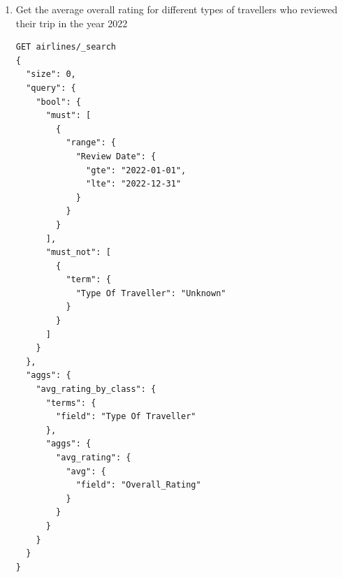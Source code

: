 \documentclass{Configuration_Files/PoliMi3i_thesis}
\begin{document}
\begin{enumerate}
    \item Get the average overall rating for different types of travellers who reviewed their trip in the year 2022

\begin{verbatim}
GET airlines/_search
{
  "size": 0,
  "query": {
    "bool": {
      "must": [
        {
          "range": {
            "Review Date": {
              "gte": "2022-01-01",
              "lte": "2022-12-31"
            }
          }
        }
      ],
      "must_not": [
        {
          "term": {
            "Type Of Traveller": "Unknown"
          }
        }
      ]
    }
  },
  "aggs": {
    "avg_rating_by_class": {
      "terms": {
        "field": "Type Of Traveller"
      },
      "aggs": {
        "avg_rating": {
          "avg": {
            "field": "Overall_Rating"
          }
        }
      }
    }
  }
}

\end{verbatim}

\newpage


\end{enumerate}
\end{document}
